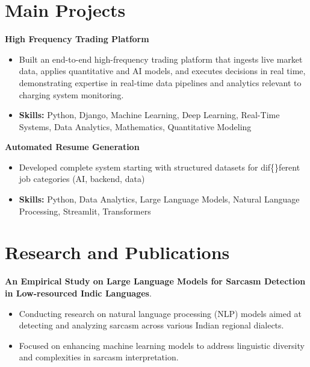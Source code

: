 \documentclass[a4paper,11pt]{article}
\begin{document}
\section{\textbf{Main Projects}}

\vspace{1mm}
  \textbf{High Frequency Trading Platform  }
\vspace{-1.5mm} %
\begin{itemize}
  \item Built an end-to-end high-frequency trading platform that ingests live market data, applies quantitative and AI models, and executes decisions in real time, demonstrating expertise in real-time data pipelines and analytics relevant to charging system monitoring.
\vspace{-3mm}
  \item \textbf{Skills:} Python, Django, Machine Learning, Deep Learning, Real-Time Systems, Data Analytics, Mathematics, Quantitative Modeling
\end{itemize}


\vspace{1mm}
   \textbf{Automated Resume Generation }
\vspace{-1.5mm} %
\begin{itemize}
  \item Developed complete system starting with structured datasets for dif\{\}ferent job categories (AI, backend, data)
\vspace{-3mm}
  \item \textbf{Skills:} Python, Data Analytics, Large Language Models, Natural Language Processing, Streamlit, Transformers
\end{itemize}



\section{\textbf{Research and Publications} \hfill }
\vspace{1mm}
  \textbf{An Empirical Study on Large Language Models for Sarcasm Detection in Low-resourced Indic Languages}.
\vspace{-1mm} %
\begin{itemize}
  \item Conducting research on natural language processing (NLP) models aimed at detecting and analyzing sarcasm across various Indian regional dialects.
\vspace{-3mm}
  \item Focused on enhancing machine learning models to address linguistic diversity and complexities in sarcasm interpretation.
\end{itemize}
\end{document}
